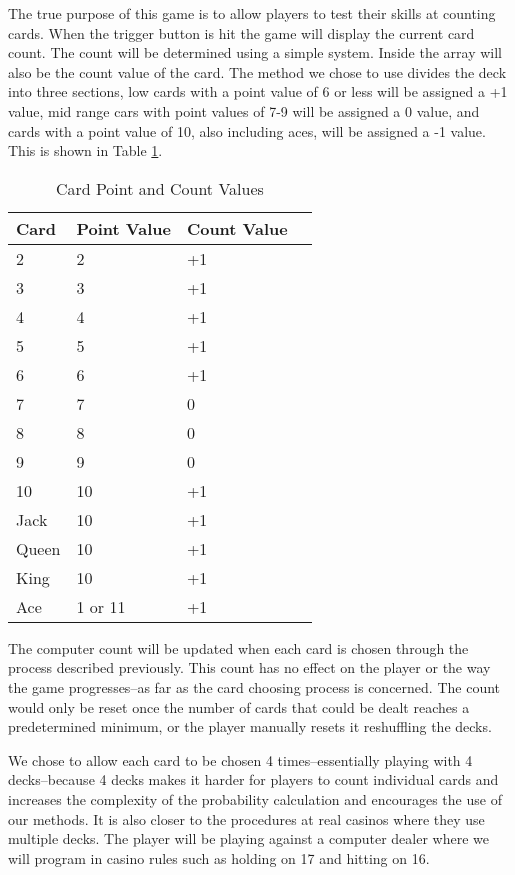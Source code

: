 \documentclass[12pt]{article}
\begin{document}
The true purpose of this game is to allow players to test their skills at counting cards. When the trigger button is hit the game will display the current card count. The count will be determined using a simple system. Inside the array will also be the count value of the card. The method we chose to use divides the deck into three sections, low cards with a point value of 6 or less will  be assigned a +1 value, mid range cars with point values of 7-9 will be assigned a 0 value, and cards with a point value of 10, also including aces, will be assigned a -1 value. This is shown in 
Table \ref{table:card_points}. 

\begin{table}[ht]
\begin{tabular}{|l|l|l|l|}
\hline
\textbf{Card} & \textbf{Point Value} & \textbf{Count Value} \\ \hline
2 & 2 & +1 \\ \hline
3 & 3 & +1 \\ \hline
4 & 4 & +1 \\ \hline
5 & 5 & +1 \\ \hline
6 & 6 & +1 \\ \hline
7 & 7 & 0 \\ \hline
8 & 8 & 0 \\ \hline
9 & 9 & 0 \\ \hline
10 & 10 & +1 \\ \hline
Jack & 10 & +1 \\ \hline
Queen & 10 & +1 \\ \hline
King & 10 & +1 \\ \hline
Ace & 1 or 11 & +1 \\ \hline
\end{tabular}
\caption{Card Point and Count Values}
\label{table:card_points}
\end{table}

The computer count will be updated when each card is chosen through the process described previously. This count has no effect on the player or the way the game progresses–as far as the card choosing process is concerned. The count would only be reset once the number of cards that could be dealt reaches a predetermined minimum, or the player manually resets it reshuffling the decks.

We chose to allow each card to be chosen 4 times–essentially playing with 4 decks–because 4 decks makes it harder for players to count individual cards and increases the complexity of the probability calculation and encourages the use of our methods. It is also closer to the procedures at real casinos where they use multiple decks. The player will be playing against a computer dealer where we will program in casino rules such as holding on 17 and hitting on 16. 
\end{document}

